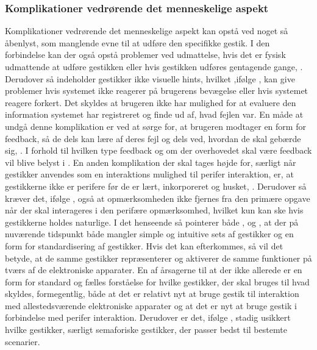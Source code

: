 \subsubsection{Komplikationer vedrørende det menneskelige aspekt}
\label{KomplikationerVedroerendeDetMenneskelige}
%
Komplikationer vedrørende det menneskelige aspekt kan opstå ved noget så åbenlyst, som manglende evne til at udføre den specifikke gestik. I den forbindelse kan der også opstå problemer ved udmattelse, hvis det er fysisk udmattende at udføre gestikken eller hvis gestikken udføres gentagende gange, \parencite[s. 28]{PDF:ATaxonomyOfGestures}. Derudover så indeholder gestikker ikke visuelle hints, hvilket ,ifølge \textcite[s. 6]{PDF:NaturalUserInterfaces}, kan give problemer hvis systemet ikke reagerer på brugerens bevægelse eller hvis systemet reagere forkert. Det skyldes at brugeren ikke har mulighed for at evaluere den information systemet har registreret og finde ud af, hvad fejlen var. En måde at undgå denne komplikation er ved at sørge for, at brugeren modtager en form for feedback, så de dels kan lære af deres fejl og dels ved, hvordan de skal gebærde sig, \parencite[s. 10]{PDF:NaturalUserInterfaces}. I forhold til hvilken type feedback og om der overhovedet skal være feedback vil blive belyst i . \blankline
%
En anden komplikation der skal tages højde for, særligt når gestikker anvendes som en interaktions mulighed til perifer interaktion, er, at gestikkerne ikke er perifere før de er lært, inkorporeret og husket, \parencite[s. 16]{PDF:PIEmbeddingHCIOnTheRelevance}. Derudover så kræver det, ifølge \textcite[s. 16]{PDF:PIEmbeddingHCIOnTheRelevance}, også at opmærksomheden ikke fjernes fra den primære opgave når der skal interageres i den perifære opmærksomhed, hvilket kun kan ske hvis gestikkerne holdes naturlige. I det henseende så pointerer både \textcite[s. 8]{PDF:NaturalUserInterfaces}, \textcite[s. 26]{PDF:ATaxonomyOfGestures} og \textcite[s. 19]{PDF:PIEmbeddingHCIOnTheRelevance}, at der på nuværende tidspunkt både mangler simple og intuitive sets af gestikker og en form for standardisering af gestikker. Hvis det kan efterkommes, så vil det betyde, at de samme gestikker repræsenterer og aktiverer de samme funktioner på tværs af de elektroniske apparater. En af årsagerne til at der ikke allerede er en form for standard og fælles forståelse for hvilke gestikker, der skal bruges til hvad skyldes, formegentlig, både at det er relativt nyt at bruge gestik til interaktion med allestedsværende elektroniske apparater og at det er nyt at bruge gestik i forbindelse med perifer interaktion. Derudover er det, ifølge \textcite[s. 28]{PDF:ATaxonomyOfGestures}, stadig usikkert hvilke gestikker, særligt semaforiske gestikker, der passer bedst til bestemte scenarier.

